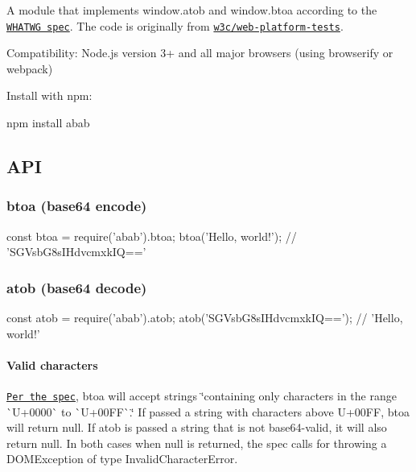 \href{https://www.npmjs.com/package/abab}{\tt } \href{https://travis-ci.org/jsdom/abab}{\tt }

A module that implements {\ttfamily window.\+atob} and {\ttfamily window.\+btoa} according to the \href{https://html.spec.whatwg.org/multipage/webappapis.html#atob}{\tt W\+H\+A\+T\+WG spec}. The code is originally from \href{https://github.com/w3c/web-platform-tests/blob/master/html/webappapis/atob/base64.html}{\tt w3c/web-\/platform-\/tests}.

Compatibility\+: Node.\+js version 3+ and all major browsers (using browserify or webpack)

Install with {\ttfamily npm}\+:


\begin{DoxyCode}
npm install abab
\end{DoxyCode}


\subsection*{A\+PI}

\subsubsection*{{\ttfamily btoa} (base64 encode)}


\begin{DoxyCode}
const btoa = require('abab').btoa;
btoa('Hello, world!'); // 'SGVsbG8sIHdvcmxkIQ=='
\end{DoxyCode}


\subsubsection*{{\ttfamily atob} (base64 decode)}


\begin{DoxyCode}
const atob = require('abab').atob;
atob('SGVsbG8sIHdvcmxkIQ=='); // 'Hello, world!'
\end{DoxyCode}


\paragraph*{Valid characters}

\href{https://html.spec.whatwg.org/multipage/webappapis.html#atob:dom-windowbase64-btoa-3}{\tt Per the spec}, {\ttfamily btoa} will accept strings \char`\"{}containing only characters in the range \`{}\+U+0000\`{} to \`{}\+U+00\+F\+F\`{}.\char`\"{} If passed a string with characters above {\ttfamily U+00\+FF}, {\ttfamily btoa} will return {\ttfamily null}. If {\ttfamily atob} is passed a string that is not base64-\/valid, it will also return {\ttfamily null}. In both cases when {\ttfamily null} is returned, the spec calls for throwing a {\ttfamily D\+O\+M\+Exception} of type {\ttfamily Invalid\+Character\+Error}.

